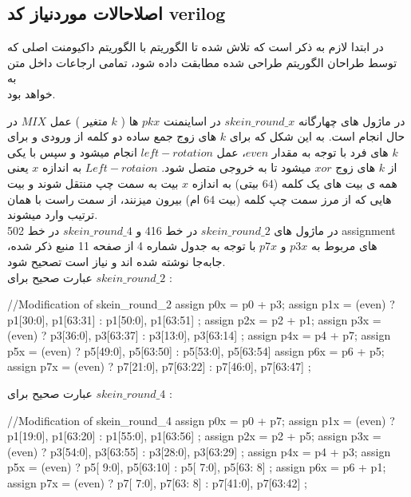 \subsection{اصلاحالات موردنیاز کد verilog}
در ابتدا لازم به ذکر است که تلاش شده تا الگوریتم با الگوریتم داکیومنت اصلی که توسط طراحان الگوریتم طراحی شده مطابقت داده شود، تمامی ارجاعات داخل متن به \\
	خواهد بود. 
\par
در ماژول های چهارگانه $skein\_round\_x$ در اساینمنت $pkx$ ها 
( $k$ متغیر )
عمل $MIX$ در حال انجام است. به این شکل که برای $k$ های زوج جمع ساده دو کلمه از ورودی و برای $k$ های فرد با توجه به مقدار $even$، عمل $left-rotation$ انجام میشود و سپس با یکی از $k$ های زوج $xor$ میشود تا به خروجی متصل شود.
$Left-rotaion$ به اندازه $x$ یعنی همه ی بیت های یک کلمه (64 بیتی) به اندازه $x$ بیت به سمت چپ منتقل شوند و بیت هایی که از مرز سمت چپ کلمه (بیت 64 ام) بیرون میزنند، از سمت راست با همان ترتیب وارد میشوند.\\
 در ماژول های $skein\_round\_2$ در خط 416 و $skein\_round\_4$ در خط 502 assignment های مربوط به $p3x$ و $p7x$ با توجه به جدول شماره 4 از صفحه 11 منبع ذکر شده، جابه‌جا نوشته شده اند و نیاز است تصحیح شود.\\
 عبارت صحیح برای $skein\_round\_2$ :
 \begin{code}
 	//Modification of skein_round_2
 	assign p0x = p0 + p3;
	assign p1x = (even) ? { p1[30:0], p1[63:31] } : { p1[50:0], p1[63:51] };
	assign p2x = p2 + p1;
	assign p3x = (even) ? { p3[36:0], p3[63:37] } : { p3[13:0], p3[63:14] };
	assign p4x = p4 + p7;
	assign p5x = (even) ? { p5[49:0], p5[63:50] } : { p5[53:0], p5[63:54] }
	assign p6x = p6 + p5;
	assign p7x = (even) ? { p7[21:0], p7[63:22] } : { p7[46:0], p7[63:47] };
 \end{code}
  عبارت صحیح برای $skein\_round\_4$ :
\begin{code}
	//Modification of skein_round_4
	assign p0x = p0 + p7;
	assign p1x = (even) ? { p1[19:0], p1[63:20] } : { p1[55:0], p1[63:56] };
	assign p2x = p2 + p5;
	assign p3x = (even) ? { p3[54:0], p3[63:55] } : { p3[28:0], p3[63:29] };
	assign p4x = p4 + p3;
	assign p5x = (even) ? { p5[ 9:0], p5[63:10] } : { p5[ 7:0], p5[63: 8] };
	assign p6x = p6 + p1;
	assign p7x = (even) ? { p7[ 7:0], p7[63: 8] } : { p7[41:0], p7[63:42] };
\end{code}

